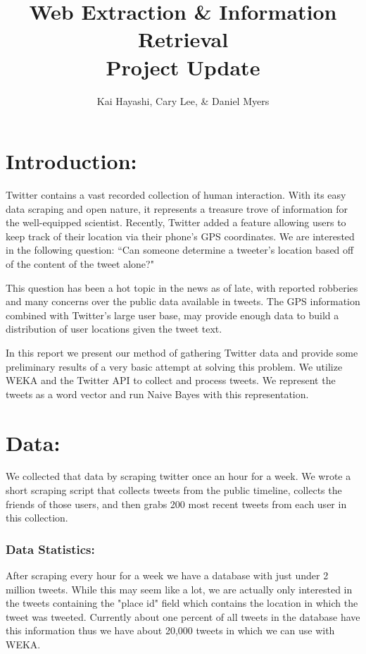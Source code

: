\documentclass[12pt]{article}
\title{Web Extraction \& Information Retrieval \\ Project Update}
\author{Kai Hayashi, Cary Lee, \& Daniel Myers}
\date{}                                           %
\begin{document}
\maketitle
\section*{Introduction:}
Twitter contains a vast recorded collection of human interaction. With its easy data scraping and open nature, it represents a treasure trove of information for the well-equipped scientist. Recently, Twitter added a feature allowing users to keep track of their location via their phone's GPS coordinates. We are interested in the following question: ``Can someone determine a tweeter's location based off of the content of the tweet alone?"

This question has been a hot topic in the news as of late, with reported robberies and many concerns over the public data available in tweets. The GPS information combined with Twitter's large user base, may provide enough data to build a distribution of user locations given the tweet text. 

In this report we present our method of gathering Twitter data and provide some preliminary results of a very basic attempt at solving this problem. We utilize WEKA and the Twitter API to collect and process tweets. We represent the tweets as a word vector and run Naive Bayes with this representation.

\section*{Data:}
We collected that data by scraping twitter once an hour for a week. We wrote a short scraping script that collects tweets from the public timeline, collects the friends of those users, and then grabs 200 most recent tweets from each user in this collection. 


\subsubsection*{Data Statistics:}
After scraping every hour for a week we have a database with just under 2 million tweets.  While this may seem like a lot, we are actually only interested in the tweets containing the "place id" field which contains the location in which the tweet was tweeted.  Currently about one percent of all tweets in the database have this information thus we have about 20,000 tweets in which we can use with WEKA.
\end{document}
